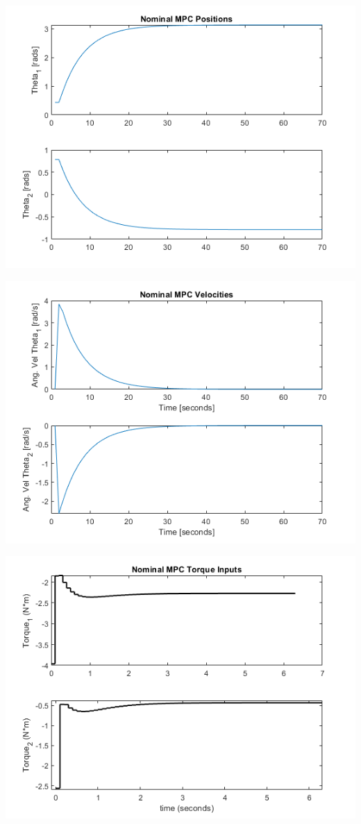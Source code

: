 \documentclass[journal]{IEEEtran}
\begin{document}
\includegraphics[scale = 0.5]{../images/Nominal_MPC/T1_X_init_25_45_0_0_X_ref_180_n45_0_0/AngularPositions}


\includegraphics[scale = 0.5]{../images/Nominal_MPC/T1_X_init_25_45_0_0_X_ref_180_n45_0_0/AngularVelocities}




\includegraphics[scale = 0.5]{../images/Nominal_MPC/T4_X_init_220_25_0_0_X_ref_180_n45_0_0/Torques}
\end{document}
